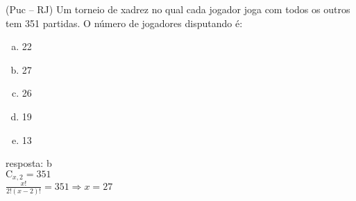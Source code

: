 \begin{ex}
 (Puc – RJ) Um torneio de xadrez no qual cada jogador joga com todos os outros tem 351 partidas. O número de jogadores disputando é:
    \begin{enumerate}[(a)]
    \item 22
    \item 27
    \item 26
    \item 19
    \item 13
    \end{enumerate}
      \begin{sol}
       resposta: b \\
       $\mathrm{C}_{x,2}=351$\\
       $\frac{x!}{2!(x-2)!}=351 \Longrightarrow x=27$
      \end{sol}
\end{ex}